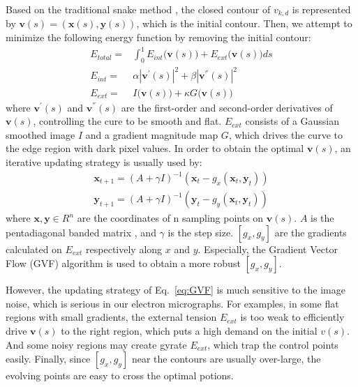 Based on the traditional snake method \cite{Kass1988}, the closed contour of $v_{k,d}$ is represented by $\mathbf{v}(s)=(\mathbf{x}(s),\mathbf{y}(s))$, which is the initial contour.
Then, we attempt to minimize the following energy function by removing the initial contour:
\begin{eqnarray}\label{eq:Etotal}
E_{total} =&\int_{0}^{1} E_{int}\big( \mathbf{v}(s) \big)+ E_{ext}\big( \mathbf{v}(s)\big) ds \\\nonumber
E_{int} = & \alpha|\mathbf{v}^{'}(s)|^2+\beta|\mathbf{v}^{''}(s)|^2 \\
E_{ext} =& I\big( \mathbf{v}(s)\big) + \kappa G\big(\mathbf{v}(s)\big)\nonumber
\end{eqnarray}
where $\mathbf{v}^{'}(s)$ and $\mathbf{v}^{''}(s)$ are the first-order and second-order derivatives of $\mathbf{v}(s)$, controlling the cure to be smooth and flat.
$E_{ext}$ consists of a Gaussian smoothed image $I$ and a gradient magnitude map $G$, which drives the curve to the edge region with dark pixel values.
In order to obtain the optimal $\mathbf{v}(s)$, an iterative updating strategy is usually used by:
\begin{eqnarray}\label{eq:GVF}
\mathbf{x}_{t+1} = (A+\gamma I)^{-1}(\mathbf{x}_t-g_x(\mathbf{x}_t,\mathbf{y}_t))\\
\mathbf{y}_{t+1} = (A+\gamma I)^{-1}(\mathbf{y}_t-g_y(\mathbf{x}_t,\mathbf{y}_t))\nonumber
\end{eqnarray}
where $\mathbf{x},\mathbf{y}\in R^n$ are the coordinates of n sampling points on $\mathbf{v}(s)$. 
$A$ is the pentadiagonal banded matrix \cite{Kass1988}, and $\gamma$ is the step size.
$[g_x,g_y]$ are the gradients calculated on $E_{ext}$ respectively along $x$ and $y$.
Especially, the Gradient Vector Flow (GVF) algorithm \cite{Xu1998} is used to obtain a more robust $[g_x,g_y ]$.

However, the updating strategy of Eq.~\ref{eq:GVF} is much sensitive to the image noise, which is serious in our electron micrographs.
For examples, in some flat regions with small gradients, the external tension $E_{ext}$ is too weak to efficiently drive $\mathbf{v}(s)$ to the right region, which puts a high demand on the initial $v(s)$.
And some noisy regions may create gyrate $E_{ext}$, which trap the control points easily.
Finally, since $[g_x,g_y ]$ near the contours are usually over-large, the evolving points are easy to cross the optimal potions.

